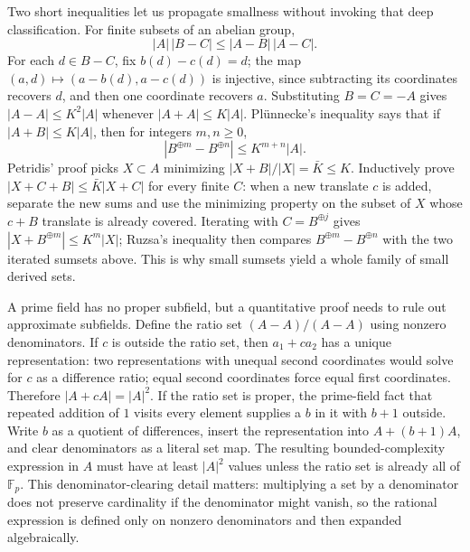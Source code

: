 Two short inequalities let us propagate smallness without invoking that deep classification. For finite subsets of an abelian group, \[
|A|\,|B-C|\le |A-B|\,|A-C|.
\] For each \(d\in B-C\), fix \(b(d)-c(d)=d\); the map \((a,d)\mapsto(a-b(d),a-c(d))\) is injective, since subtracting its coordinates recovers \(d\), and then one coordinate recovers \(a\). Substituting \(B=C=-A\) gives \(|A-A|\le K^2|A|\) whenever \(|A+A|\le K|A|\). Plünnecke's inequality says that if \(|A+B|\le K|A|\), then for integers \(m,n\ge0\), \[
|B^{\oplus m}-B^{\oplus n}|\le K^{m+n}|A|.
\] Petridis' proof picks \(X\subset A\) minimizing \(|X+B|/|X|=\bar K\le K\). Inductively prove \(|X+C+B|\le\bar K|X+C|\) for every finite \(C\): when a new translate \(c\) is added, separate the new sums and use the minimizing property on the subset of \(X\) whose \(c+B\) translate is already covered. Iterating with \(C=B^{\oplus j}\) gives \(|X+B^{\oplus m}|\le K^m|X|\); Ruzsa's inequality then compares \(B^{\oplus m}-B^{\oplus n}\) with the two iterated sumsets above. This is why small sumsets yield a whole family of small derived sets.

A prime field has no proper subfield, but a quantitative proof needs to rule out approximate subfields. Define the ratio set \((A-A)/(A-A)\) using nonzero denominators. If \(c\) is outside the ratio set, then \(a_1+ca_2\) has a unique representation: two representations with unequal second coordinates would solve for \(c\) as a difference ratio; equal second coordinates force equal first coordinates. Therefore \(|A+cA|=|A|^2\). If the ratio set is proper, the prime-field fact that repeated addition of \(1\) visits every element supplies a \(b\) in it with \(b+1\) outside. Write \(b\) as a quotient of differences, insert the representation into \(A+(b+1)A\), and clear denominators as a literal set map. The resulting bounded-complexity expression in \(A\) must have at least \(|A|^2\) values unless the ratio set is already all of \(\mathbb F_p\). This denominator-clearing detail matters: multiplying a set by a denominator does not preserve cardinality if the denominator might vanish, so the rational expression is defined only on nonzero denominators and then expanded algebraically.

